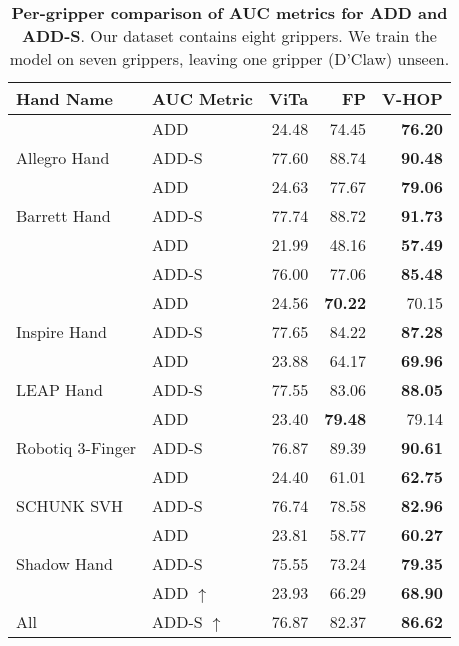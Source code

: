 \documentclass[11pt, a4paper, logo, twocolumn]{brown}
\newcommand{\autosizeTable}[1]{%
    \begin{adjustbox}{max width=\linewidth}
        #1
    \end{adjustbox}
}
\begin{document}
\begin{table}[t]
\centering
\autosizeTable{
\begin{tabular}{l l|r|r|r }
\hline
Hand Name & AUC Metric & ViTa & FP & V-HOP \\
\hline
 & ADD  & 24.48 & 74.45 & \cellcolor{gold} \textbf{76.20} \\
\multirow{-2}{*}{Allegro Hand} & ADD-S  & 77.60 & 88.74 & \cellcolor{gold} \textbf{90.48} \\
 & ADD  & 24.63 & 77.67 & \cellcolor{gold} \textbf{79.06} \\
\multirow{-2}{*}{Barrett Hand} & ADD-S  & 77.74 & 88.72 & \cellcolor{gold} \textbf{91.73} \\
\rowcolor{gray!20} & ADD  & 21.99 & 48.16 & \cellcolor{gold} \textbf{57.49} \\
\rowcolor{gray!20}\multirow{-2}{*}{D'Claw (Unseen)} & ADD-S  & 76.00 & 77.06 & \cellcolor{gold} \textbf{85.48} \\
 & ADD  & 24.56 & \cellcolor{gold} \textbf{70.22} & 70.15 \\
\multirow{-2}{*}{Inspire Hand} & ADD-S  & 77.65 & 84.22 & \cellcolor{gold} \textbf{87.28} \\
 & ADD  & 23.88 & 64.17 & \cellcolor{gold} \textbf{69.96} \\
\multirow{-2}{*}{LEAP Hand} & ADD-S  & 77.55 & 83.06 & \cellcolor{gold} \textbf{88.05} \\
 & ADD  & 23.40 & \cellcolor{gold} \textbf{79.48} & 79.14 \\
\multirow{-2}{*}{Robotiq 3-Finger} & ADD-S  & 76.87 & 89.39 & \cellcolor{gold} \textbf{90.61} \\
 & ADD  & 24.40 & 61.01 & \cellcolor{gold} \textbf{62.75} \\
\multirow{-2}{*}{SCHUNK SVH} & ADD-S  & 76.74 & 78.58 & \cellcolor{gold} \textbf{82.96} \\
 & ADD  & 23.81 & 58.77 & \cellcolor{gold} \textbf{60.27} \\
\multirow{-2}{*}{Shadow Hand} & ADD-S  & 75.55 & 73.24 & \cellcolor{gold} \textbf{79.35} \\
\hline 
 & ADD $\uparrow$ & 23.93 & 66.29 & \cellcolor{gold} \textbf{68.90} \\
\multirow{-2}{*}{All} & ADD-S $\uparrow$ & 76.87 & 82.37 & \cellcolor{gold} \textbf{86.62} \\
\hline
\end{tabular}}
\caption{\textbf{Per-gripper comparison of AUC metrics for ADD and ADD-S}. Our dataset contains eight grippers. We train the model on seven grippers, leaving one gripper (D'Claw) unseen. }
\label{tab:per-gripper-result}
\end{table}
\end{document}
